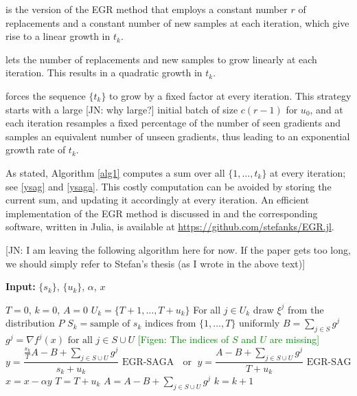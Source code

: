 \documentclass[11pt]{article}
\begin{document}
\medskip{} is the version of the EGR method that employs a constant number $r$ of replacements and a constant number of new samples at each iteration, which give rise to a linear growth in $t_k$.

\medskip{}  lets the number of replacements and new samples to grow linearly at each iteration. This results in a  quadratic growth in $t_k$.

\medskip{} forces the sequence $\{ t_k \}$ to grow by a fixed factor at every iteration. This strategy starts with a large {\color{blue}[JN: why large?]} initial batch of size $c(r-1)$ for $u_0$, and at each iteration resamples a fixed percentage of the number of seen gradients and samples an equivalent number of unseen gradients, thus leading to an exponential growth rate of $t_k$. 
 
As stated, Algorithm \ref{alg1} computes a sum over all $\{1, \ldots ,t_k \} $ at every iteration; see \eqref{ysag} and \eqref{ysaga}. This costly computation can be avoided by storing the current sum, and updating it accordingly at every iteration. An efficient implementation of the EGR method is discussed in \cite{stefan-thesis} and the corresponding software, written in Julia, is available at \url{https://github.com/stefanks/EGR.jl}.

\bigskip
  
  {\color{blue}[JN: I am leaving the following algorithm here for now. If the paper gets too long, we should simply refer to Stefan's thesis (as I wrote in the above text)]}
  \begin{algorithm}
  	[H] 
  	\caption{EGR Algorithm (Implementation Version)}
  	\label{alg1-IMP}
  	{\bf Input:} $\{ s_k\} $, $\{ u_k \}$, $\alpha$, $x$
  	\begin{algorithmic}
  		[1] 
  		\State $T= 0$, $k = 0$, $A = 0$
  		\Loop 
  		\State $U_k =\{T+1,\ldots,T+u_k \}$ 
  		\State For all $j \in U_k$ draw $\xi^j$ from the distribution $P$ 
  		\State $S_k = \mbox{sample of } s_k \mbox{ indices from }\{ 1, \ldots ,T\}$ uniformly
  		\State $B = \sum_{j \in S} g^j$ 
  		\State $g^j =  \nabla f^j(x) \mbox{ for all } j \in S\cup U$ \textcolor{green}{[Figen: The indices of $S$ and $U$ are missing]}
  		\State 
  		\begin{equation}
  			y =  \frac{\frac{s_k}{T} A - B +\sum_{j \in S\cup U}g^j}{s_k+u_k} \mbox{ EGR-SAGA } \; \mbox{ or } \; y =  \frac{A - B +\sum_{j \in S\cup U}g^j}{T+u_k} \mbox{ EGR-SAG } 
  		\end{equation}
  		\State $x  =  x - \alpha y$ 
  		\State $T =  T +u_k$ 
  		\State $A  =  A - B+ \sum_{j \in S\cup U}g^j$ 
  		\State $k = k+1$ 
  		\EndLoop 
  	\end{algorithmic}
  \end{algorithm}
  
\end{document}
